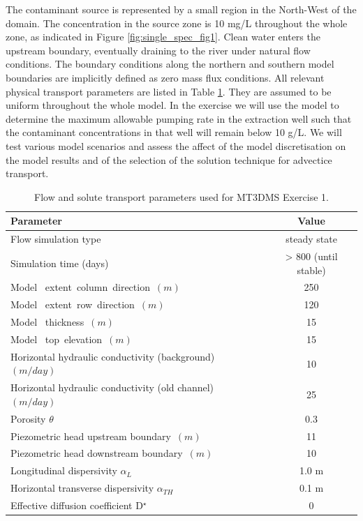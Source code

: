 The contaminant source is represented by a small region in the North-West of the domain. 
The concentration in the source zone is 10 mg/L throughout the whole zone,
as indicated in Figure \ref{fig:single_spec_fig1}. 
Clean water enters the upstream boundary, eventually draining to the river 
under natural flow conditions. The boundary conditions along the northern 
and southern model boundaries are implicitly defined as zero mass flux conditions. 
All relevant physical transport parameters are listed in Table \ref{single_spec_table_1}.
They are assumed to be uniform throughout the whole model.
In the exercise we will use the model to determine the maximum allowable 
pumping rate in the extraction well such that the contaminant 
concentrations in that well will remain below 10 \micro g/L.
We will test various model scenarios and assess the affect of the model discretisation
on the model results and of the selection of the solution technique for advectice transport.

\begin{table}[hb]
\caption{Flow and solute transport parameters used for MT3DMS Exercise 1.}
\begin{center}
\begin{tabular}{lc} 
\toprule
Parameter                                            &         Value \\
\midrule
Flow simulation type                                 &        steady state \\
Simulation time (days)                               &  > 800 (until stable) \\
Model \  extent\ column\ direction\ $ (m)$           &  250            \\
Model \  extent\ row\ direction\ $ (m)  $            &  120            \\
Model \  thickness\ $(m)$                            &   15            \\
Model \ top\ elevation\ $(m)$                        &   15            \\
Horizontal hydraulic conductivity (background)\ $(m/day)$         &   10     \\
Horizontal hydraulic conductivity (old channel)\ $(m/day)$         &   25     \\  
Porosity $\theta$                                   &           0.3  \\
Piezometric head upstream boundary\ $(m) $           &  11        \\ 
Piezometric head downstream boundary\ $(m) $         &  10            \\ 
Longitudinal dispersivity $\alpha_L$                &           1.0 m \\
Horizontal transverse dispersivity $\alpha_{TH}$    &           0.1 m \\
Effective diffusion coefficient D$^{\star}$          &             0  \\
\bottomrule

\end{tabular}
\label{single_spec_table_1}
\end{center}
\end{table}


